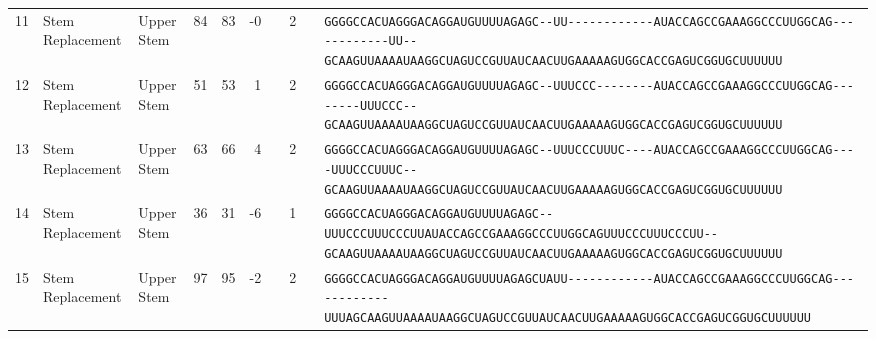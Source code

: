 \begin{tabular}{rllrrrrrcl}
 11 & Stem Replacement & Upper Stem & 84 & 83 & -0 &  & 2 &  &
 \color{ucsfdarkgrey}\verb|GGGGCCACUAGGGACAGGAU|\color{ucsforange}\verb|GUUUUA|\color{ucsfblue}\verb|GAGC--UU------------|\color{ucsfpurple}\verb|AUACCAGCCGAAAGGCCCUUGGCAG|\color{ucsfblue}\verb|------------UU--GCAAGU|\color{ucsforange}\verb|UAAAAUAA|\color{ucsfnavy}\verb|GGCUAGUCC|\color{ucsforange}\verb|GUUAUCA|\color{ucsfteal}\verb|ACUUGAAAAAGU|\color{ucsforange}\verb|GGCACCGAGUCGGUGCUUUUUU| \\

 12 & Stem Replacement & Upper Stem & 51 & 53 & 1 &  & 2 &  &
 \color{ucsfdarkgrey}\verb|GGGGCCACUAGGGACAGGAU|\color{ucsforange}\verb|GUUUUA|\color{ucsfblue}\verb|GAGC--UUUCCC--------|\color{ucsfpurple}\verb|AUACCAGCCGAAAGGCCCUUGGCAG|\color{ucsfblue}\verb|--------UUUCCC--GCAAGU|\color{ucsforange}\verb|UAAAAUAA|\color{ucsfnavy}\verb|GGCUAGUCC|\color{ucsforange}\verb|GUUAUCA|\color{ucsfteal}\verb|ACUUGAAAAAGU|\color{ucsforange}\verb|GGCACCGAGUCGGUGCUUUUUU| \\

 13 & Stem Replacement & Upper Stem & 63 & 66 & 4 &  & 2 &  &
 \color{ucsfdarkgrey}\verb|GGGGCCACUAGGGACAGGAU|\color{ucsforange}\verb|GUUUUA|\color{ucsfblue}\verb|GAGC--UUUCCCUUUC----|\color{ucsfpurple}\verb|AUACCAGCCGAAAGGCCCUUGGCAG|\color{ucsfblue}\verb|----UUUCCCUUUC--GCAAGU|\color{ucsforange}\verb|UAAAAUAA|\color{ucsfnavy}\verb|GGCUAGUCC|\color{ucsforange}\verb|GUUAUCA|\color{ucsfteal}\verb|ACUUGAAAAAGU|\color{ucsforange}\verb|GGCACCGAGUCGGUGCUUUUUU| \\

 14 & Stem Replacement & Upper Stem & 36 & 31 & -6 &  & 1 &  &
 \color{ucsfdarkgrey}\verb|GGGGCCACUAGGGACAGGAU|\color{ucsforange}\verb|GUUUUA|\color{ucsfblue}\verb|GAGC--UUUCCCUUUCCCUU|\color{ucsfpurple}\verb|AUACCAGCCGAAAGGCCCUUGGCAG|\color{ucsfblue}\verb|UUUCCCUUUCCCUU--GCAAGU|\color{ucsforange}\verb|UAAAAUAA|\color{ucsfnavy}\verb|GGCUAGUCC|\color{ucsforange}\verb|GUUAUCA|\color{ucsfteal}\verb|ACUUGAAAAAGU|\color{ucsforange}\verb|GGCACCGAGUCGGUGCUUUUUU| \\

 15 & Stem Replacement & Upper Stem & 97 & 95 & -2 &  & 2 &  &
 \color{ucsfdarkgrey}\verb|GGGGCCACUAGGGACAGGAU|\color{ucsforange}\verb|GUUUUA|\color{ucsfblue}\verb|GAGCUAUU------------|\color{ucsfpurple}\verb|AUACCAGCCGAAAGGCCCUUGGCAG|\color{ucsfblue}\verb|------------UUUAGCAAGU|\color{ucsforange}\verb|UAAAAUAA|\color{ucsfnavy}\verb|GGCUAGUCC|\color{ucsforange}\verb|GUUAUCA|\color{ucsfteal}\verb|ACUUGAAAAAGU|\color{ucsforange}\verb|GGCACCGAGUCGGUGCUUUUUU| \\


\end{tabular}
